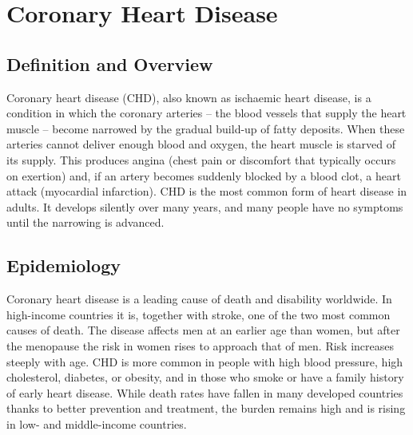 \chapter{Coronary Heart Disease}

\section*{Definition and Overview}
Coronary heart disease (CHD), also known as ischaemic heart disease, is a condition in which the coronary arteries -- the blood vessels that supply the heart muscle -- become narrowed by the gradual build-up of fatty deposits. When these arteries cannot deliver enough blood and oxygen, the heart muscle is starved of its supply. This produces angina (chest pain or discomfort that typically occurs on exertion) and, if an artery becomes suddenly blocked by a blood clot, a heart attack (myocardial infarction). CHD is the most common form of heart disease in adults. It develops silently over many years, and many people have no symptoms until the narrowing is advanced.

\section*{Epidemiology}
Coronary heart disease is a leading cause of death and disability worldwide. In high-income countries it is, together with stroke, one of the two most common causes of death. The disease affects men at an earlier age than women, but after the menopause the risk in women rises to approach that of men. Risk increases steeply with age. CHD is more common in people with high blood pressure, high cholesterol, diabetes, or obesity, and in those who smoke or have a family history of early heart disease. While death rates have fallen in many developed countries thanks to better prevention and treatment, the burden remains high and is rising in low- and middle-income countries.

